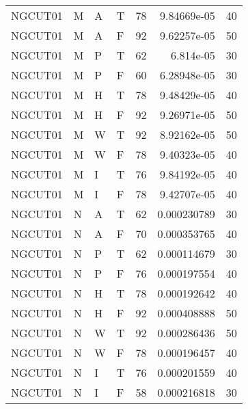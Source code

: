\begin{tabular}{llllrrr}
    NGCUT01  & M     & A     & T          & 78         & 9.84669e-05 & 40       \\
    NGCUT01  & M     & A     & F          & 92         & 9.62257e-05 & 50       \\
    NGCUT01  & M     & P     & T          & 62         & 6.814e-05   & 30       \\
    NGCUT01  & M     & P     & F          & 60         & 6.28948e-05 & 30       \\
    NGCUT01  & M     & H     & T          & 78         & 9.48429e-05 & 40       \\
    NGCUT01  & M     & H     & F          & 92         & 9.26971e-05 & 50       \\
    NGCUT01  & M     & W     & T          & 92         & 8.92162e-05 & 50       \\
    NGCUT01  & M     & W     & F          & 78         & 9.40323e-05 & 40       \\
    NGCUT01  & M     & I     & T          & 76         & 9.84192e-05 & 40       \\
    NGCUT01  & M     & I     & F          & 78         & 9.42707e-05 & 40       \\
    NGCUT01  & N     & A     & T          & 62         & 0.000230789 & 30       \\
    NGCUT01  & N     & A     & F          & 70         & 0.000353765 & 40       \\
    NGCUT01  & N     & P     & T          & 62         & 0.000114679 & 30       \\
    NGCUT01  & N     & P     & F          & 76         & 0.000197554 & 40       \\
    NGCUT01  & N     & H     & T          & 78         & 0.000192642 & 40       \\
    NGCUT01  & N     & H     & F          & 92         & 0.000408888 & 50       \\
    NGCUT01  & N     & W     & T          & 92         & 0.000286436 & 50       \\
    NGCUT01  & N     & W     & F          & 78         & 0.000196457 & 40       \\
    NGCUT01  & N     & I     & T          & 76         & 0.000201559 & 40       \\
    NGCUT01  & N     & I     & F          & 58         & 0.000216818 & 30       \\
    \hline
\end{tabular}